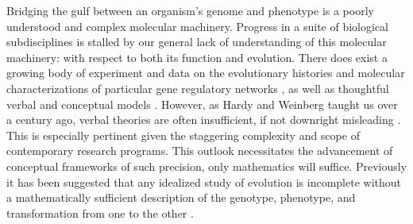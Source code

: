 \documentclass[9 pt]{article}
\newcommand{\1}{\mathbbm{1}}
\begin{document}
\begin{multicols}{2}
Bridging the gulf between an organism's genome and phenotype is a poorly understood and complex molecular machinery. Progress in a suite of biological subdisciplines is stalled by our general lack of understanding of this molecular machinery: with respect to both its function and evolution. There does exist a growing body of experiment and data on the evolutionary histories and molecular characterizations of particular gene regulatory networks \citep{jaeger2011gap, davidson2006gene, israel2016comparative}, as well as thoughtful verbal and conceptual models \citep{true2001developmental, gwagner1}. However, as Hardy and Weinberg taught us over a century ago, verbal theories are often insufficient, if not downright misleading \citep{hardy1908mendelian, weinberg1908vererbungsgesetze, servedio2014not}. This is especially pertinent given the staggering complexity and scope of contemporary research programs. This outlook necessitates the advancement of conceptual frameworks of such precision, only mathematics will suffice. Previously it has been suggested that any idealized study of evolution is incomplete without a mathematically sufficient description of the genotype, phenotype, and transformation from one to the other \citep{Lewontin1974genetic}.%





\end{multicols}
\end{document}
